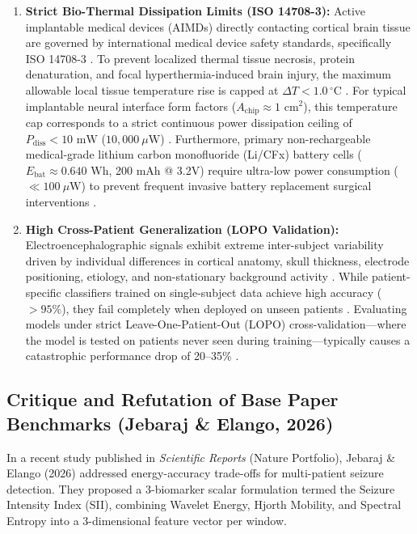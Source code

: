 \documentclass[pdflatex,sn-mathphys-num]{sn-jnl}%
\begin{document}
\begin{enumerate}
    \item \textbf{Strict Bio-Thermal Dissipation Limits (ISO 14708-3):} Active implantable medical devices (AIMDs) directly contacting cortical brain tissue are governed by international medical device safety standards, specifically ISO 14708-3 \cite{iso14708_3}. To prevent localized thermal tissue necrosis, protein denaturation, and focal hyperthermia-induced brain injury, the maximum allowable local tissue temperature rise is capped at $\Delta T < 1.0\,^\circ\text{C}$ \cite{pennes1948analysis}. For typical implantable neural interface form factors ($A_{\text{chip}} \approx 1\text{ cm}^2$), this temperature cap corresponds to a strict continuous power dissipation ceiling of $P_{\text{diss}} < 10\text{ mW}$ ($10,000\ \mu\text{W}$) \cite{davies2018loihi}. Furthermore, primary non-rechargeable medical-grade lithium carbon monofluoride (Li/CFx) battery cells ($E_{\text{bat}} \approx 0.640\text{ Wh}$, 200 mAh @ 3.2V) require ultra-low power consumption ($\ll 100\ \mu\text{W}$) to prevent frequent invasive battery replacement surgical interventions \cite{jebaraj2026}.
    
    \item \textbf{High Cross-Patient Generalization (LOPO Validation):} Electroencephalographic signals exhibit extreme inter-subject variability driven by individual differences in cortical anatomy, skull thickness, electrode positioning, etiology, and non-stationary background activity \cite{chen2026review, chen2026driver}. While patient-specific classifiers trained on single-subject data achieve high accuracy ($>95\%$), they fail completely when deployed on unseen patients \cite{alotaibi2024enhancing}. Evaluating models under strict Leave-One-Patient-Out (LOPO) cross-validation---where the model is tested on patients never seen during training---typically causes a catastrophic performance drop of 20--35\% \cite{farooq2026patient, kashefiamiri2025epileptic}.
\end{enumerate}

\subsection{Critique and Refutation of Base Paper Benchmarks (Jebaraj \& Elango, 2026)}

In a recent study published in \emph{Scientific Reports} (Nature Portfolio), Jebaraj \& Elango (2026) \cite{jebaraj2026} addressed energy-accuracy trade-offs for multi-patient seizure detection. They proposed a 3-biomarker scalar formulation termed the Seizure Intensity Index (SII), combining Wavelet Energy, Hjorth Mobility, and Spectral Entropy into a 3-dimensional feature vector per window. 
\end{document}
